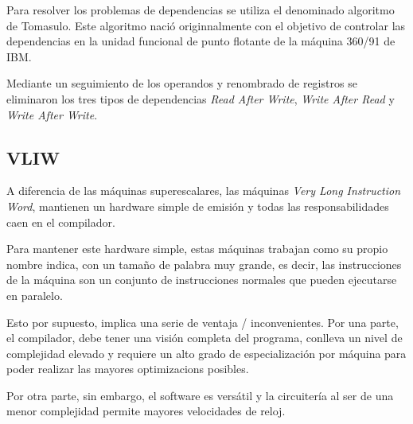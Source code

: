 \bigskip
Para resolver los problemas de dependencias se utiliza el denominado algoritmo de Tomasulo.
Este algoritmo nació originnalmente con el objetivo de controlar las dependencias en la unidad
funcional de punto flotante de la máquina 360/91 de IBM.

\bigskip
Mediante un seguimiento de los operandos y renombrado de registros se eliminaron los tres tipos 
de dependencias \textit{Read After Write}, \textit{Write After Read} y \textit{Write After Write}. 

\subsection{VLIW}

A diferencia de las máquinas superescalares, las máquinas \textit{Very Long Instruction Word},
mantienen un hardware simple de emisión y todas las responsabilidades caen en el compilador.

\bigskip
Para mantener este hardware simple, estas máquinas trabajan como su propio nombre indica, con
un tamaño de palabra muy grande, es decir, las instrucciones de la máquina son un conjunto
de instrucciones normales que pueden ejecutarse en paralelo.

\bigskip
Esto por supuesto, implica una serie de ventaja / inconvenientes. Por una parte, el compilador,
debe tener una visión completa del programa, conlleva un nivel de complejidad elevado y requiere
un alto grado de especialización por máquina para poder realizar las mayores optimizacions posibles.

\bigskip
Por otra parte, sin embargo, el software es versátil y la circuitería al ser de una menor complejidad 
permite mayores velocidades de reloj.